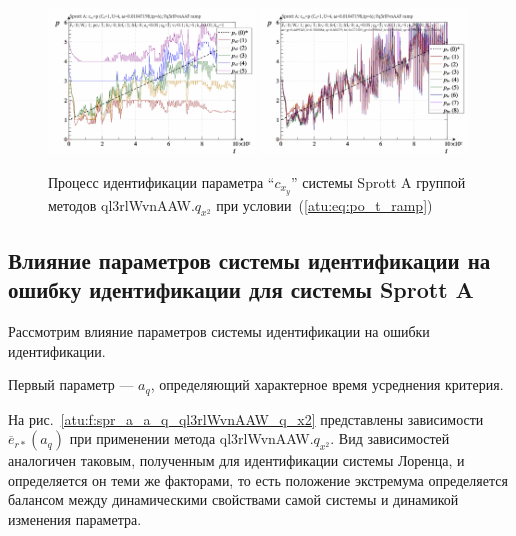 \begin{figure}[htb!]
  \centerline{
    \includegraphics[width=0.49\textwidth]{p/cha/spr_a/Fq3rlFvnAAF_x2/sprott_a_id-p_t_pi_Fq3rlFvnAAF_ramp.png}
    \hfill
    \includegraphics[width=0.49\textwidth]{p/cha/spr_a/Fq3rlFvnAAF_x2/sprott_a_id-p_t_p_Fq3rlFvnAAF_ramp.png}
  }
  \caption{Процесс идентификации параметра ``$c_{x_y}$'' системы Sprott A группой методов ql3rlWvnAAW.$q_{x^2}$ при условии~(\ref{atu:eq:po_t_ramp})}
  \label{atu:f:spr_a_id_Fq3rlFvnAAF_q_x2_ramp}
\end{figure}




\subsection{Влияние параметров системы идентификации на ошибку идентификации для системы Sprott A}  %


Рассмотрим влияние параметров системы идентификации на
ошибки идентификации.

Первый параметр ---
$a_q$, определяющий характерное время усреднения критерия.

На рис.~\ref{atu:f:spr_a_a_q_ql3rlWvnAAW_q_x2} представлены зависимости
$\overline{e}_{r*}(a_q)$ при применении метода ql3rlWvnAAW.$q_{x^2}$.
Вид зависимостей аналогичен таковым, полученным для идентификации
системы Лоренца, и определяется он теми же факторами,
то есть положение экстремума определяется балансом между
динамическими свойствами самой системы и динамикой
изменения параметра.


